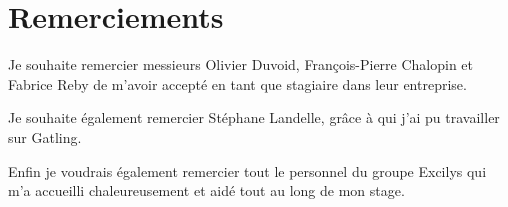 \chapter{Remerciements}
Je souhaite remercier messieurs Olivier Duvoid, François-Pierre Chalopin et Fabrice Reby de m'avoir accepté en tant que stagiaire dans leur entreprise.

Je souhaite également remercier Stéphane Landelle, grâce à qui j'ai pu travailler sur Gatling.

Enfin je voudrais également remercier tout le personnel du groupe Excilys qui m'a accueilli chaleureusement et aidé tout au long de mon stage.